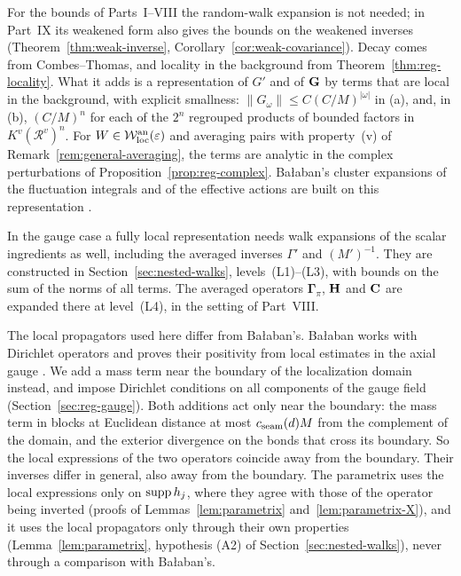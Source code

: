 \begin{remark}
For the bounds of Parts~I--VIII the random-walk expansion is not needed; in Part~IX its weakened form also gives the bounds on the weakened inverses (Theorem~\ref{thm:weak-inverse}, Corollary~\ref{cor:weak-covariance}). Decay comes from Combes--Thomas, and locality in the background from Theorem~\ref{thm:reg-locality}. What it adds is a representation of $G'$ and of $\mathbf G$ by terms that are local in the background, with explicit smallness: $\|G_\omega\|\le C(C/M)^{|\omega|}$ in (a), and, in (b), $(C/M)^n$ for each of the $2^n$ regrouped products of bounded factors in $K^v(\mathcal R^v)^n$. For $W\in\mathcal W^{\rm an}_{\rm loc}(\varepsilon)$ and averaging pairs with property~(v) of Remark~\ref{rem:general-averaging}, the terms are analytic in the complex perturbations of Proposition~\ref{prop:reg-complex}. Ba\l aban's cluster expansions of the fluctuation integrals and of the effective actions are built on this representation \cite{BalBackground}.

In the gauge case a fully local representation needs walk expansions of the scalar ingredients as well, including the averaged inverses $\Gamma'$ and $(M')^{-1}$. They are constructed in Section~\ref{sec:nested-walks}, levels~(L1)--(L3), with bounds on the sum of the norms of all terms. The averaged operators $\boldsymbol\Gamma_\pi$, $\mathbf H$ and $\mathbf C$ are expanded there at level~(L4), in the setting of Part~VIII.

The local propagators used here differ from Ba\l aban's. Ba\l aban works with Dirichlet operators and proves their positivity from local estimates in the axial gauge \cite[Lemma~2.4]{BalPropII}. We add a mass term near the boundary of the localization domain instead, and impose Dirichlet conditions on all components of the gauge field (Section~\ref{sec:reg-gauge}). Both additions act only near the boundary: the mass term in blocks at Euclidean distance at most $c_{\rm seam}(d)M$ from the complement of the domain, and the exterior divergence on the bonds that cross its boundary. So the local expressions of the two operators coincide away from the boundary. Their inverses differ in general, also away from the boundary. The parametrix uses the local expressions only on $\operatorname{supp} h_j$, where they agree with those of the operator being inverted (proofs of Lemmas~\ref{lem:parametrix} and~\ref{lem:parametrix-X}), and it uses the local propagators only through their own properties (Lemma~\ref{lem:parametrix}, hypothesis (A2) of Section~\ref{sec:nested-walks}), never through a comparison with Ba\l aban's.
\end{remark}
